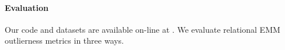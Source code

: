 {%
%
%
%
%
\paragraph{Evaluation} Our code and datasets are available on-line at \cite{url}. We evaluate relational EMM outlierness metrics in three ways.

}
